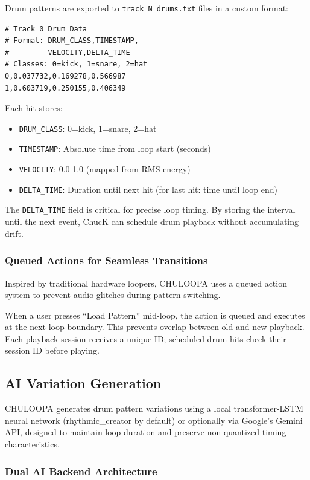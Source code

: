 \documentclass{aimc2026}
\begin{document}
Drum patterns are exported to \texttt{track\_N\_drums.txt} files in a custom format:

\begin{verbatim}
# Track 0 Drum Data
# Format: DRUM_CLASS,TIMESTAMP,
#         VELOCITY,DELTA_TIME
# Classes: 0=kick, 1=snare, 2=hat
0,0.037732,0.169278,0.566987
1,0.603719,0.250155,0.406349
\end{verbatim}

Each hit stores:
\begin{itemize}
\item \texttt{DRUM\_CLASS}: 0=kick, 1=snare, 2=hat
\item \texttt{TIMESTAMP}: Absolute time from loop start (seconds)
\item \texttt{VELOCITY}: 0.0-1.0 (mapped from RMS energy)
\item \texttt{DELTA\_TIME}: Duration until next hit (for last hit: time until loop end)
\end{itemize}

The \texttt{DELTA\_TIME} field is critical for precise loop timing. By storing the interval until the next event, ChucK can schedule drum playback without accumulating drift.

\subsubsection{Queued Actions for Seamless Transitions}

Inspired by traditional hardware loopers, CHULOOPA uses a queued action system to prevent audio glitches during pattern switching.

When a user presses ``Load Pattern'' mid-loop, the action is queued and executes at the next loop boundary. This prevents overlap between old and new playback. Each playback session receives a unique ID; scheduled drum hits check their session ID before playing.

\subsection{AI Variation Generation}

CHULOOPA generates drum pattern variations using a local transformer-LSTM neural network (rhythmic\_creator by default) or optionally via Google's Gemini API, designed to maintain loop duration and preserve non-quantized timing characteristics.

\subsubsection{Dual AI Backend Architecture}
\end{document}
